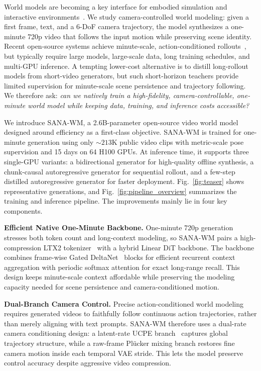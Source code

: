 \documentclass{llmxive}
\providecommand{\modelname}{SANA-WM\xspace}
\begin{document}
World models are becoming a key interface for embodied simulation and interactive environments~\citep{world_models,genie3,gaia1,dreamdojo,aether,hy_worldplay,lingbot_world,infinite_world}.
We study camera-controlled world modeling: given a first frame, text, and a 6-DoF camera trajectory, the model synthesizes a one-minute 720p video that follows the input motion while preserving scene identity.
Recent open-source systems achieve minute-scale, action-conditioned rollouts~\citep{infinite_world,matrixgame3,lingbot_world,hy_worldplay}, but typically require large models, large-scale data, long training schedules, and multi-GPU inference.
A tempting lower-cost alternative is to distill long-rollout models from short-video generators, but such short-horizon teachers provide limited supervision for minute-scale scene persistence and trajectory following.
We therefore ask: \textit{can we natively train a high-fidelity, camera-controllable, one-minute world model while keeping data, training, and inference costs accessible?}

\noindent We introduce \modelname, a 2.6B-parameter open-source video world model designed around efficiency as a first-class objective.
\modelname is trained for one-minute generation using only ${\sim}213$K public video clips with metric-scale pose supervision and 15 days on 64 H100 GPUs.
At inference time, it supports three single-GPU variants: a bidirectional generator for high-quality offline synthesis, a chunk-causal autoregressive generator for sequential rollout, and a few-step distilled autoregressive generator for faster deployment.
Fig.~\ref{fig:teaser} shows representative generations, and Fig.~\ref{fig:pipeline_overview} summarizes the training and inference pipeline.
The improvements mainly lie in four key components.

\noindent\textbf{Efficient Native One-Minute Backbone.}
One-minute 720p generation stresses both token count and long-context modeling, so \modelname pairs a high-compression LTX2 tokenizer~\citep{ltx2} with a hybrid Linear DiT backbone.
The backbone combines frame-wise Gated DeltaNet~\citep{gated_deltanet} blocks for efficient recurrent context aggregation with periodic softmax attention for exact long-range recall.
This design keeps minute-scale context affordable while preserving the modeling capacity needed for scene persistence and camera-conditioned motion.

\noindent\textbf{Dual-Branch Camera Control.}
Precise action-conditioned world modeling requires generated videos to faithfully follow continuous action trajectories, rather than merely aligning with text prompts.
\modelname therefore uses a dual-rate camera conditioning design: a latent-rate UCPE branch~\citep{ucpe} captures global trajectory structure, while a raw-frame Pl\"ucker mixing branch restores fine camera motion inside each temporal VAE stride.
This lets the model preserve control accuracy despite aggressive video compression.
\end{document}
